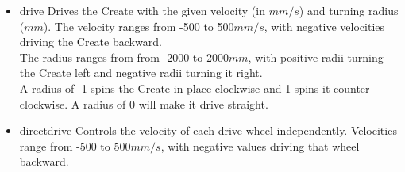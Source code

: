 \documentclass {article}
\begin{document}
\begin {itemize}         
  \item {} {drive}
        Drives the Create with the given velocity (in $mm/s$) and turning radius ($mm$).  The
        velocity ranges from -500 to 500$mm/s$, with negative velocities driving the Create
        backward. \\
        The radius ranges from from -2000 to 2000$mm$, with positive radii turning the Create left
        and negative radii turning it right. \\
        A radius of -1 spins the Create in place clockwise and 1 spins it counter-clockwise.  A
        radius of 0 will make it drive straight. \\
        \retnorm

  \item {} {directdrive}
        Controls the velocity of each drive wheel independently.  Velocities range from -500 to
        500$mm/s$, with negative values driving that wheel backward. \\
        \retnorm


\end{itemize}
\end{document}
